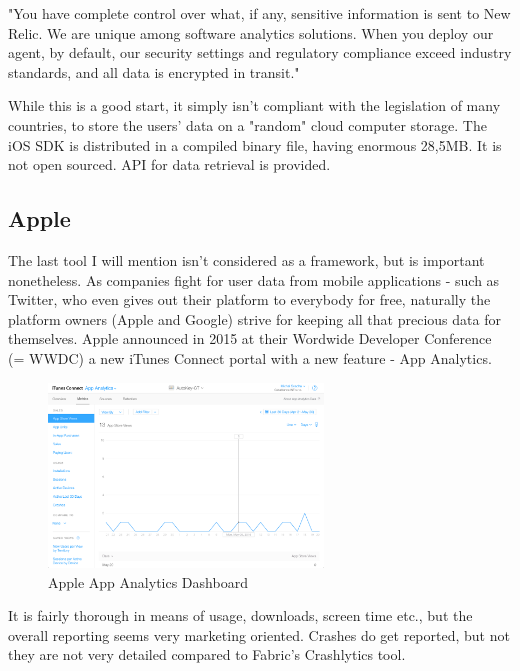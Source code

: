 "You have complete control over what, if any, sensitive information is sent to New Relic. We are unique among software analytics solutions. When you deploy our agent, by default, our security settings and regulatory compliance exceed industry standards, and all data is encrypted in transit." \cite{newrelic}

\bigbreak

While this is a good start, it simply isn't compliant with the legislation of many countries, to store the users' data on a "random" cloud computer storage. The iOS SDK is distributed in a compiled binary file, having enormous 28,5MB. It is not open sourced. API for data retrieval is provided.

\subsection{Apple}

The last tool I will mention isn't considered as a framework, but is important nonetheless. As companies fight for user data from mobile applications - such as Twitter, who even gives out their platform to everybody for free, naturally the platform owners (Apple and Google) strive for keeping all that precious data for themselves. Apple announced in 2015 at their Wordwide Developer Conference (= WWDC) a new iTunes Connect portal with a new feature - App Analytics. 

\newpage

\begin{figure}[!ht]
	\centering
	\includegraphics[width=0.65\textwidth]{figures/appleanalytics}
    \caption{Apple App Analytics Dashboard}
\end{figure}

It is fairly thorough in means of usage, downloads, screen time etc., but the overall reporting seems very marketing oriented. Crashes do get reported, but not they are not very detailed compared to Fabric's Crashlytics tool.

